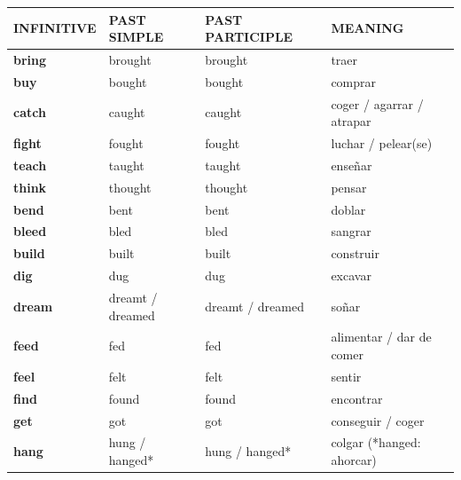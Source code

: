 \documentclass[11pt,a4paper]{article}
\newcommand{\cab}[1]{\small\textbf{\color{#1O}INFINITIVE} & \small\textbf{\color{#1O}PAST SIMPLE} & \small\textbf{\color{#1O}PAST\,PARTICIPLE} & \small\textbf{\color{#1O}MEANING}\\[1pt]}
\begin{document}
\begin{longtable}{>{\bfseries}p{2.8cm}p{3.5cm}p{3.7cm}>{\raggedright\arraybackslash}p{6.6cm}}
\cab{verde}\endhead
\textcolor{verdeO}{bring} & \textcolor{verdeO}{brought} & \textcolor{verdeO}{brought} & \textcolor{verdeO}{traer}\\
\textcolor{verdeO}{buy} & \textcolor{verdeO}{bought} & \textcolor{verdeO}{bought} & \textcolor{verdeO}{comprar}\\
\textcolor{verdeO}{catch} & \textcolor{verdeO}{caught} & \textcolor{verdeO}{caught} & \textcolor{verdeO}{coger / agarrar / atrapar}\\
\textcolor{verdeO}{fight} & \textcolor{verdeO}{fought} & \textcolor{verdeO}{fought} & \textcolor{verdeO}{luchar / pelear(se)}\\
\textcolor{verdeO}{teach} & \textcolor{verdeO}{taught} & \textcolor{verdeO}{taught} & \textcolor{verdeO}{enseñar}\\
\textcolor{verdeO}{think} & \textcolor{verdeO}{thought} & \textcolor{verdeO}{thought} & \textcolor{verdeO}{pensar}\\
\textcolor{verdeO}{bend} & \textcolor{verdeO}{bent} & \textcolor{verdeO}{bent} & \textcolor{verdeO}{doblar}\\
\textcolor{verdeO}{bleed} & \textcolor{verdeO}{bled} & \textcolor{verdeO}{bled} & \textcolor{verdeO}{sangrar}\\
\textcolor{verdeO}{build} & \textcolor{verdeO}{built} & \textcolor{verdeO}{built} & \textcolor{verdeO}{construir}\\
\textcolor{verdeO}{dig} & \textcolor{verdeO}{dug} & \textcolor{verdeO}{dug} & \textcolor{verdeO}{excavar}\\
\textcolor{verdeO}{dream} & \textcolor{verdeO}{dreamt / dreamed} & \textcolor{verdeO}{dreamt / dreamed} & \textcolor{verdeO}{soñar}\\
\textcolor{verdeO}{feed} & \textcolor{verdeO}{fed} & \textcolor{verdeO}{fed} & \textcolor{verdeO}{alimentar / dar de comer}\\
\textcolor{verdeO}{feel} & \textcolor{verdeO}{felt} & \textcolor{verdeO}{felt} & \textcolor{verdeO}{sentir}\\
\textcolor{verdeO}{find} & \textcolor{verdeO}{found} & \textcolor{verdeO}{found} & \textcolor{verdeO}{encontrar}\\
\textcolor{verdeO}{get} & \textcolor{verdeO}{got} & \textcolor{verdeO}{got} & \textcolor{verdeO}{conseguir / coger}\\
\textcolor{verdeO}{hang} & \textcolor{verdeO}{hung / hanged*} & \textcolor{verdeO}{hung / hanged*} & \textcolor{verdeO}{colgar (*hanged: ahorcar)}\\

\end{longtable}
\end{document}
